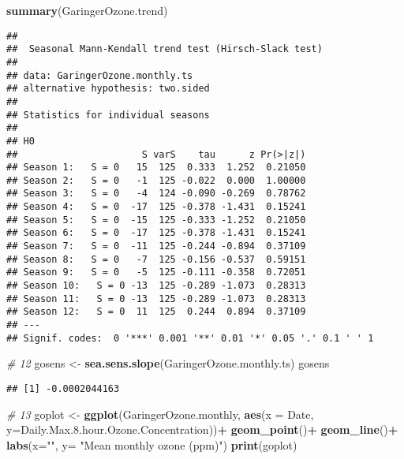 \documentclass[
]{article}
\newenvironment{Shaded}{\begin{snugshade}}{\end{snugshade}}
\newcommand{\CommentTok}[1]{\textcolor[rgb]{0.56,0.35,0.01}{\textit{#1}}}
\newcommand{\DataTypeTok}[1]{\textcolor[rgb]{0.13,0.29,0.53}{#1}}
\newcommand{\FloatTok}[1]{\textcolor[rgb]{0.00,0.00,0.81}{#1}}
\newcommand{\KeywordTok}[1]{\textcolor[rgb]{0.13,0.29,0.53}{\textbf{#1}}}
\newcommand{\NormalTok}[1]{#1}
\newcommand{\OperatorTok}[1]{\textcolor[rgb]{0.81,0.36,0.00}{\textbf{#1}}}
\newcommand{\StringTok}[1]{\textcolor[rgb]{0.31,0.60,0.02}{#1}}
\begin{document}
\begin{Shaded}
\begin{Highlighting}[]
  \KeywordTok{summary}\NormalTok{(GaringerOzone.trend)}
\end{Highlighting}
\end{Shaded}

\begin{verbatim}
## 
##  Seasonal Mann-Kendall trend test (Hirsch-Slack test)
## 
## data: GaringerOzone.monthly.ts
## alternative hypothesis: two.sided
## 
## Statistics for individual seasons
## 
## H0
##                      S varS    tau      z Pr(>|z|)  
## Season 1:   S = 0   15  125  0.333  1.252  0.21050  
## Season 2:   S = 0   -1  125 -0.022  0.000  1.00000  
## Season 3:   S = 0   -4  124 -0.090 -0.269  0.78762  
## Season 4:   S = 0  -17  125 -0.378 -1.431  0.15241  
## Season 5:   S = 0  -15  125 -0.333 -1.252  0.21050  
## Season 6:   S = 0  -17  125 -0.378 -1.431  0.15241  
## Season 7:   S = 0  -11  125 -0.244 -0.894  0.37109  
## Season 8:   S = 0   -7  125 -0.156 -0.537  0.59151  
## Season 9:   S = 0   -5  125 -0.111 -0.358  0.72051  
## Season 10:   S = 0 -13  125 -0.289 -1.073  0.28313  
## Season 11:   S = 0 -13  125 -0.289 -1.073  0.28313  
## Season 12:   S = 0  11  125  0.244  0.894  0.37109  
## ---
## Signif. codes:  0 '***' 0.001 '**' 0.01 '*' 0.05 '.' 0.1 ' ' 1
\end{verbatim}

\begin{Shaded}
\begin{Highlighting}[]
\CommentTok{# 12}
\NormalTok{gosens <-}\StringTok{ }\KeywordTok{sea.sens.slope}\NormalTok{(GaringerOzone.monthly.ts)}
\NormalTok{gosens}
\end{Highlighting}
\end{Shaded}

\begin{verbatim}
## [1] -0.0002044163
\end{verbatim}

\begin{Shaded}
\begin{Highlighting}[]
\CommentTok{# 13}
\NormalTok{goplot <-}\StringTok{ }\KeywordTok{ggplot}\NormalTok{(GaringerOzone.monthly, }\KeywordTok{aes}\NormalTok{(}\DataTypeTok{x =}\NormalTok{ Date, }\DataTypeTok{y=}\NormalTok{Daily.Max.}\FloatTok{8.}\NormalTok{hour.Ozone.Concentration))}\OperatorTok{+}
\StringTok{  }\KeywordTok{geom_point}\NormalTok{()}\OperatorTok{+}
\StringTok{  }\KeywordTok{geom_line}\NormalTok{()}\OperatorTok{+}
\StringTok{  }\KeywordTok{labs}\NormalTok{(}\DataTypeTok{x=}\StringTok{""}\NormalTok{, }\DataTypeTok{y=} \StringTok{"Mean monthly ozone (ppm)"}\NormalTok{)}
\KeywordTok{print}\NormalTok{(goplot)}
\end{Highlighting}
\end{Shaded}
\end{document}

